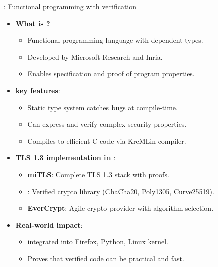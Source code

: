 \documentclass[aspectratio=169, lualatex, handout]{beamer}
\begin{document}
\begin{frame}{\fstar: Functional programming with verification}
	\begin{itemize}[<+->]
		\item \textbf{What is \fstar?}
		      \begin{itemize}
			      \item Functional programming language with dependent types.
			      \item Developed by Microsoft Research and Inria.
			      \item Enables specification and proof of program properties.
		      \end{itemize}
		\item \textbf{\fstar key features}:
		      \begin{itemize}
			      \item Static type system catches bugs at compile-time.
			      \item Can express and verify complex security properties.
			      \item Compiles to efficient C code via KreMLin compiler.
		      \end{itemize}
		\item \textbf{TLS 1.3 implementation in \fstar}:
		      \begin{itemize}
			      \item \textbf{miTLS}: Complete TLS 1.3 stack with proofs.
			      \item \textbf{\haclstar}: Verified crypto library (ChaCha20, Poly1305, Curve25519).
			      \item \textbf{EverCrypt}: Agile crypto provider with algorithm selection.
		      \end{itemize}
		\item \textbf{Real-world impact}:
		      \begin{itemize}
			      \item \haclstar integrated into Firefox, Python, Linux kernel.
			      \item Proves that verified code can be practical and fast.
		      \end{itemize}
	\end{itemize}
\end{frame}
\end{document}
